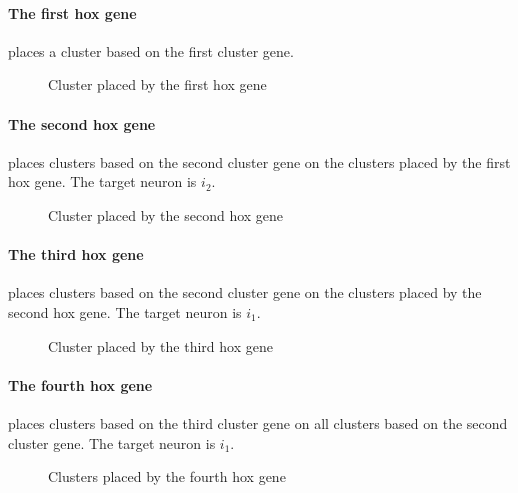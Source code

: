 \paragraph{The first hox gene} places a cluster based on the first cluster gene.
\FloatBarrier
\begin{figure}[H]
    \centering
    
    \caption{Cluster placed by the first hox gene}
\end{figure}
\FloatBarrier

\newpage

\paragraph{The second hox gene} places clusters based on the second cluster gene on the clusters placed by the first hox gene.
The target neuron is $i_2$.
\begin{figure}[H]
    \centering
    
    \caption{Cluster placed by the second hox gene}
\end{figure}

\paragraph{The third hox gene} places clusters based on the second cluster gene on the clusters placed by the second hox gene.
The target neuron is $i_1$.
\begin{figure}[H]
    \centering
    
    \caption{Cluster placed by the third hox gene}
\end{figure}

\paragraph{The fourth hox gene} places clusters based on the third cluster gene on all clusters based on the second cluster gene.
The target neuron is $i_1$.
\begin{figure}[H]
    \centering
    
    \caption{Clusters placed by the fourth hox gene}
\end{figure}
